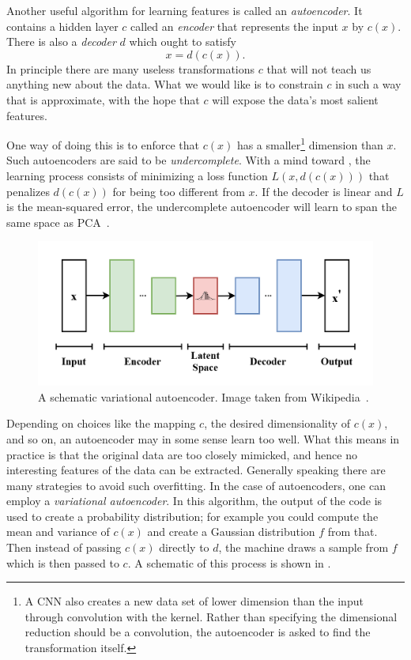 Another useful algorithm for learning features is called an
{\it autoencoder}. It contains a hidden layer
$c$ called an {\it encoder} that represents the input $x$
by $c(x)$. There is also a {\it decoder} $d$ which ought to satisfy
\begin{equation}\label{eq:autoencoder}
x=d(c(x)).
\end{equation}
In principle there are many useless transformations
$c$ that will not teach us anything new about the data. What we would like is to
constrain $c$ in such a way that  is approximate,
with the hope that $c$ will expose the data's most salient features.

One way of doing this is to enforce that $c(x)$ has a smaller\footnote{A CNN
also creates a new data set of lower dimension than the input through
convolution with the kernel. Rather than specifying the dimensional reduction
should be a convolution, the autoencoder is asked to find the transformation
itself.} dimension than $x$. Such autoencoders are said to be
{\it undercomplete}. With a mind toward 
, the learning process consists of minimizing
a loss function $L(x,d(c(x)))$ that penalizes $d(c(x))$ for being
too different from $x$. If the decoder is linear and $L$ is
the mean-squared error, the undercomplete autoencoder will learn to
span the same space as PCA~\cite{Goodfellow_2016}. 

\begin{figure}
\includegraphics[width=\linewidth]{figs/VAE.png}
\caption{A schematic variational autoencoder.
Image taken from Wikipedia~\cite{wikiVAE}.}
\label{fig:VAE}
\end{figure}

Depending on choices like the mapping $c$, the desired dimensionality of $c(x)$,
and so on, an autoencoder may in some sense learn too well. What this means in
practice is that the original data are too closely mimicked, and hence no
interesting features of the data can be extracted. Generally speaking there
are many strategies to avoid such overfitting. In the case of autoencoders,
one can employ a {\it variational autoencoder}.
In this algorithm, the output of the code is used to create a probability
distribution; for example you could compute the mean and variance of $c(x)$ and
create a Gaussian distribution $f$ from that. Then instead of passing $c(x)$
directly to $d$, the machine draws a sample from $f$ which is then passed to
$c$. A schematic of this process is shown in .

